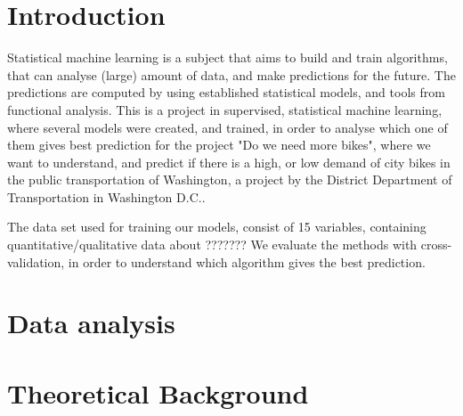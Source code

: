 \section{Introduction}
Statistical machine learning is a subject that aims to build and train algorithms, that can analyse (large) amount of data, and make predictions for the future. The predictions are computed by using established statistical models, and tools from functional analysis. This is a project in supervised, statistical machine learning, where several models were created, and trained, in order to analyse which one of them gives best prediction for the project "Do we need more bikes", where we want to understand, and predict if there is a high, or low demand of city bikes in the public transportation of Washington, a project by the District Department of Transportation in Washington D.C..

The data set used for training our models, consist of 15 variables, containing quantitative/qualitative data about ???????
We evaluate the methods with cross-validation, in order to understand which algorithm gives the best prediction.



\section{Data analysis}

















\section{Theoretical Background}



